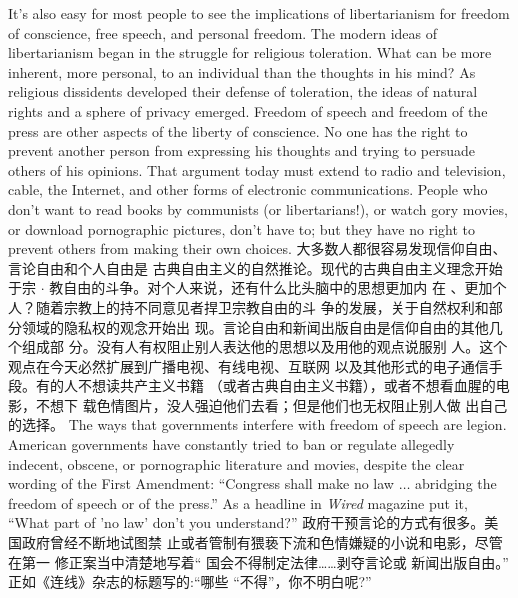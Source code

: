 \begin{paracol}{2}
It's also easy for most people to see the implications of libertarianism for freedom of conscience, free speech, and personal freedom. The modern ideas of libertarianism began in the struggle
for religious toleration. What can be more inherent, more personal, to an individual than the thoughts in his mind? As religious dissidents developed their defense of toleration, the ideas
of natural rights and a sphere of privacy emerged. Freedom of
speech and freedom of the press are other aspects of the liberty
of conscience. No one has the right to prevent another person
from expressing his thoughts and trying to persuade others of
his opinions. That argument today must extend to radio and
television, cable, the Internet, and other forms of electronic
communications. People who don't want to read books by communists (or libertarians!), or watch gory movies, or download
pornographic pictures, don't have to; but they have no right to
prevent others from making their own choices.
\switchcolumn
大多数人都很容易发现信仰自由、言论自由和个人自由是
古典自由主义的自然推论。现代的古典自由主义理念开始于宗
$\cdot$ 教自由的斗争。对个人来说，还有什么比头脑中的思想更加内
在 、更加个人？随着宗教上的持不同意见者捍卫宗教自由的斗
争的发展，关于自然权利和部分领域的隐私权的观念开始出
现。言论自由和新闻出版自由是信仰自由的其他几个组成部
分。没有人有权阻止别人表达他的思想以及用他的观点说服别
人。这个观点在今天必然扩展到广播电视、有线电视、互联网
以及其他形式的电子通信手段。有的人不想读共产主义书籍
（或者古典自由主义书籍），或者不想看血腥的电影，不想下
载色情图片，没人强迫他们去看；但是他们也无权阻止别人做
出自己的选择。
\switchcolumn*
The ways that governments interfere with freedom of speech
are legion. American governments have constantly tried to ban
or regulate allegedly indecent, obscene, or pornographic literature and movies, despite the clear wording of the First Amendment: ``Congress shall make no law $\ldots$ abridging the freedom
of speech or of the press.'' As a headline in \textit{Wired} magazine put
it, ``What part of 'no law' don't you understand?''
\switchcolumn
政府干预言论的方式有很多。美国政府曾经不断地试图禁
止或者管制有猥亵下流和色情嫌疑的小说和电影，尽管在第一
修正案当中清楚地写着“ 国会不得制定法律……剥夺言论或
新闻出版自由。” 正如《连线》杂志的标题写的:“哪些 “不得”，你不明白呢?”


\end{paracol}
